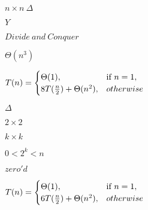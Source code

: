 \documentclass[10pt]{book}
\begin{document}
\begin{mdSnippets}
\begin{mdInlineSnippet}[b90730a0a57c4f06ed9be3903c8fa6dc]%
$n \times n~\Delta$\end{mdInlineSnippet}%
\begin{mdInlineSnippet}[57cec4137b614c87cb4e24a3d003a3e0]%
$Y$\end{mdInlineSnippet}%
\begin{mdInlineSnippet}[2d08780acf67a275f74853e0d7e41fe6]%
$Divide~and~Conquer$\end{mdInlineSnippet}%
\begin{mdInlineSnippet}[e8b8e970f95ac1fee81e92d688736ee3]%
$\Theta(n^{3})$\end{mdInlineSnippet}%
\begin{mdInlineSnippet}%
$\begin{aligned}T(n) &= \begin{cases}\Theta(1),  & \text{if } n = 1,\\8T({n \over 2}) + \Theta(n^{2}), & otherwise\end{cases}\end{aligned}$\end{mdInlineSnippet}%
\begin{mdInlineSnippet}[967878d1da852d4b07a961e3168b0fff]%
$\Delta$\end{mdInlineSnippet}%
\begin{mdInlineSnippet}[e9e2d0e7f31469e64f6434cd932d5861]%
$2 \times 2$\end{mdInlineSnippet}%
\begin{mdInlineSnippet}[0e898d89e8b27c3fa57391e4c4c4ca8c]%
$k \times k$\end{mdInlineSnippet}%
\begin{mdInlineSnippet}[07270f4733236215cb7884b59c9a7cc2]%
$0 < 2^k < n$\end{mdInlineSnippet}%
\begin{mdInlineSnippet}%
$zero'd$\end{mdInlineSnippet}%
\begin{mdInlineSnippet}[4fd13d2f2b3696e5d516cc6fdca48b03]%
$\begin{aligned}T(n) &= \begin{cases} \Theta(1),  & \text{if } n = 1,\\6T({n \over 2}) + \Theta(n^{2}), & otherwise\end{cases}\end{aligned}$\end{mdInlineSnippet}%

\end{mdSnippets}
\end{document}
